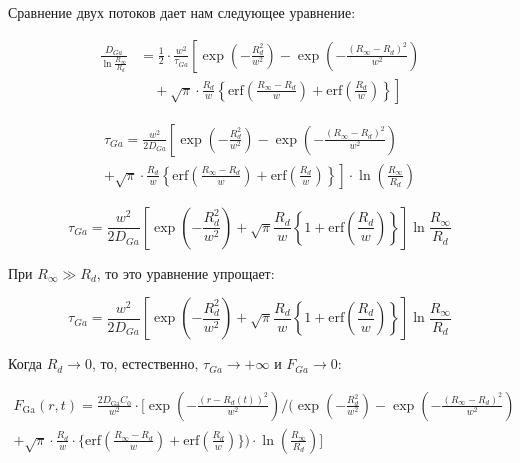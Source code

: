 \documentclass[14pt,oneside]{extarticle}
\begin{document}
Сравнение двух потоков дает нам следующее уравнение:

\[
    \begin{split}
    \frac{D_{Ga}}{\ln\frac{R_{\infty}}{R_{d}}} &= \frac{1}{2} \cdot \frac{w^{2}}{\tau_{Ga}} \left[
    \exp\left(-\frac{R_{d}^{2}}{w^{2}}\right)
    - \exp\left(-\frac{(R_{\infty} - R_{d})^{2}}{w^{2}}\right) \right. \\
    &\quad + \left. \sqrt{\pi} \cdot \frac{R_{d}}{w}
    \left\{ \text{erf}\left(\frac{R_{\infty} - R_{d}}{w}\right)
    + \text{erf}\left(\frac{R_{d}}{w}\right) \right\}
    \right]
    \end{split}
\]
    

\begin{equation}
    \begin{split}
    \tau_{Ga} = \frac{w^{2}}{2 D_{Ga}} \left[
    \exp\left(-\frac{R_{d}^{2}}{w^{2}}\right)
    - \exp\left(-\frac{(R_{\infty} - R_{d})^{2}}{w^{2}}\right) \right. \\
    \left. + \sqrt{\pi} \cdot \frac{R_{d}}{w}
    \left\{ \text{erf}\left(\frac{R_{\infty} - R_{d}}{w}\right)
    + \text{erf}\left(\frac{R_{d}}{w}\right) \right\}
    \right] \cdot \ln\left(\frac{R_{\infty}}{R_{d}}\right)
    \end{split}
\end{equation}

\begin{equation}
\tau_{Ga}=\frac{w^{2}}{2D_{Ga}}\left[\exp\left(-\frac{R_{d}^{2}}{w^{2}}\right)+\sqrt{\pi}\frac{R_{d}}{w}\left\{ 1+\text{erf}\left(\frac{R_{d}}{w}\right)\right\} \right]\ln\frac{R_{\infty}}{R_{d}}
\end{equation}

При $R_{\infty}\gg R_{d}$, то это уравнение упрощает:

\begin{equation}
\tau_{Ga}=\frac{w^{2}}{2D_{Ga}}\left[\exp\left(-\frac{R_{d}^{2}}{w^{2}}\right)+\sqrt{\pi}\frac{R_{d}}{w}\left\{ 1+\text{erf}\left(\frac{R_{d}}{w}\right)\right\} \right]\ln\frac{R_{\infty}}{R_{d}}
\end{equation}

Когда $R_{d}\to0$, то, естественно, $\tau_{Ga}\to+\infty$ и $F_{Ga}\to0$:
    
\[
    \begin{split}
    F_{\text{Ga}}(r,t) = \frac{2 D_{\text{Ga}} C_0}{w^2} \cdot \Bigg[ 
    \exp\left( -\frac{(r - R_d(t))^2}{w^2} \right) 
    \bigg/ \Big( 
    \exp\left( -\frac{R_d^2}{w^2} \right) 
    - \exp\left( -\frac{(R_{\infty} - R_d)^2}{w^2} \right) \\
    + \sqrt{\pi} \cdot \frac{R_d}{w} \cdot \bigg\{
    \text{erf}\left( \frac{R_{\infty} - R_d}{w} \right) 
    + \text{erf}\left( \frac{R_d}{w} \right) 
    \bigg\} \Big) 
    \cdot \ln\left( \frac{R_{\infty}}{R_d} \right) 
    \Bigg]
    \end{split}
\]  
\end{document}
